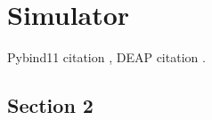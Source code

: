 \chapter{Simulator}

Pybind11 citation \cite{jakob2017pybind11}, DEAP citation \cite{fortin2012deap}.

\section{Section 2}
